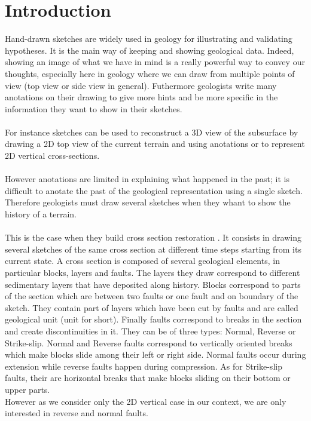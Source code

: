 \documentclass[12pt, a4paper]{report} %
\begin{document}
\chapter{Introduction}
\label{ch:intro}
Hand-drawn sketches are widely used in geology for illustrating and validating hypotheses. It is the main way of keeping and showing geological data. Indeed, showing an image of what we have in mind is a really powerful way to convey our thoughts, especially here in geology where we can draw from multiple points of view (top view or side view in general). Futhermore geologists write many anotations on their drawing to give more hints and be more specific in the information they want to show in their sketches.\\\\
For instance sketches can be used to reconstruct a 3D view of the subsurface by drawing a 2D top view of the current terrain and using anotations \cite{brazil} or to represent 2D vertical cross-sections. \\\\
However anotations are limited in explaining what happened in the past; it is difficult to anotate the past of the geological representation using a single sketch. Therefore geologists must draw several sketches when they whant to show the history of a terrain. \\\\
This is the case when they build cross section restoration \cite{SectionRestoration}. It consists in drawing several sketches of the same cross section at different time steps starting from its current state. A cross section is composed of several geological elements, in particular blocks, layers and faults. The layers they draw correspond to different sedimentary layers that have deposited  along history. Blocks correspond to parts of the section which are between two faults or one fault and on boundary of the sketch. They contain part of layers which have been cut by faults and are called geological unit (unit for short).
Finally faults correspond to breaks in the section and create discontinuities in it. They can be of three types:
Normal, Reverse or Strike-slip. Normal and Reverse faults correspond to vertically oriented breaks which make blocks slide among their left or right side. Normal faults occur during extension while reverse faults happen during compression. As for Strike-slip faults, their are horizontal breaks that make blocks sliding on their bottom or upper parts.\\
However as we consider only the 2D vertical case in our context, we are only interested in reverse and normal faults.\\\\
\end{document}
